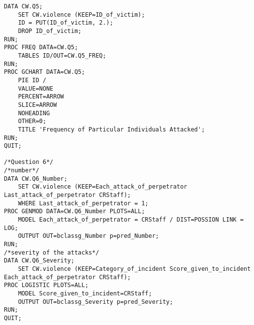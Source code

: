 \begin{lstlisting}
DATA CW.Q5;
	SET CW.violence (KEEP=ID_of_victim);
	ID = PUT(ID_of_victim, 2.);
	DROP ID_of_victim;
RUN;
PROC FREQ DATA=CW.Q5;
	TABLES ID/OUT=CW.Q5_FREQ;
RUN;
PROC GCHART DATA=CW.Q5;
	PIE ID /
	VALUE=NONE
	PERCENT=ARROW
	SLICE=ARROW
	NOHEADING
	OTHER=0;
	TITLE 'Frequency of Particular Individuals Attacked';
RUN;
QUIT;

/*Question 6*/
/*number*/
DATA CW.Q6_Number;
	SET CW.violence (KEEP=Each_attack_of_perpetrator Last_attack_of_perpetrator CRStaff);
	WHERE Last_attack_of_perpetrator = 1;
PROC GENMOD DATA=CW.Q6_Number PLOTS=ALL;
	MODEL Each_attack_of_perpetrator = CRStaff / DIST=POSSION LINK = LOG;
	OUTPUT OUT=bclassg_Number p=pred_Number;
RUN;
/*severity of the attacks*/
DATA CW.Q6_Severity;
	SET CW.violence (KEEP=Category_of_incident Score_given_to_incident Each_attack_of_perpetrator CRStaff);
PROC LOGISTIC PLOTS=ALL;
	MODEL Score_given_to_incident=CRStaff;
	OUTPUT OUT=bclassg_Severity p=pred_Severity;
RUN;
QUIT;
\end{lstlisting}
